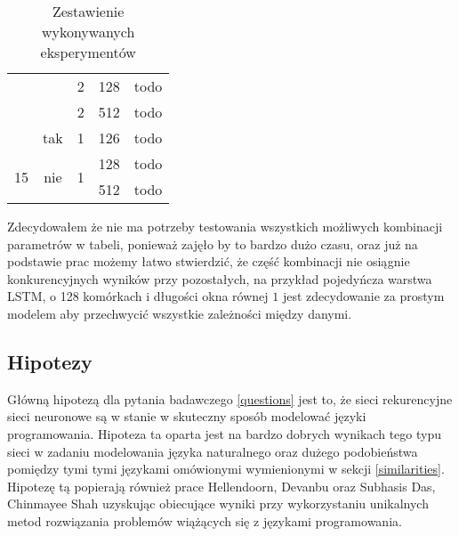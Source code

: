 \begin{table}[ht]
{\begin{tabular}{ccccc}
            \multicolumn{1}{|c|}{}                    & \multicolumn{1}{c|}{}                     & \multicolumn{1}{c|}{2}                  & \multicolumn{1}{c|}{128}                        & \multicolumn{1}{c|}{todo}                         \\ \cline{3-5} 
            \multicolumn{1}{|c|}{}                    & \multicolumn{1}{c|}{}                     & \multicolumn{1}{c|}{2}                  & \multicolumn{1}{c|}{512}                        & \multicolumn{1}{c|}{todo}                         \\ \cline{2-5} 
            \multicolumn{1}{|c|}{}                    & \multicolumn{1}{c|}{tak}                  & \multicolumn{1}{c|}{1}                  & \multicolumn{1}{c|}{126}                        & \multicolumn{1}{c|}{todo}                         \\ \hline
            \multicolumn{1}{|c|}{\multirow{2}{*}{15}} & \multicolumn{1}{c|}{\multirow{2}{*}{nie}} & \multicolumn{1}{c|}{\multirow{2}{*}{1}} & \multicolumn{1}{c|}{128}                        & \multicolumn{1}{c|}{todo}                         \\ \cline{4-5} 
            \multicolumn{1}{|c|}{}                    & \multicolumn{1}{c|}{}                     & \multicolumn{1}{c|}{}                   & \multicolumn{1}{c|}{512}                        & \multicolumn{1}{c|}{todo}                         \\ \hline
            \end{tabular}}
    \caption{Zestawienie wykonywanych eksperymentów} 
    \label{eksperymenty}
\end{table} 
Zdecydowałem że nie ma potrzeby testowania wszystkich możliwych kombinacji parametrów w tabeli, ponieważ zajęło by to bardzo dużo czasu, oraz już na podstawie prac 
\cite{hellendoorn, pythia} możemy łatwo stwierdzić, że część kombinacji nie osiągnie konkurencyjnych wyników przy pozostałych, na przykład pojedyńcza warstwa LSTM, o 
128 komórkach i długości okna równej \begin{math}1\end{math} jest zdecydowanie za prostym modelem aby przechwycić wszystkie zależności między danymi. 


\subsection{Hipotezy}
Główną hipotezą dla pytania badawczego \ref{questions} jest to, że sieci rekurencyjne sieci neuronowe są w stanie w skuteczny sposób modelować języki programowania. Hipoteza 
ta oparta jest na bardzo dobrych wynikach tego typu sieci w zadaniu modelowania języka naturalnego oraz dużego podobieństwa pomiędzy tymi tymi językami omówionymi wymienionymi 
w sekcji \ref{similarities}. Hipotezę tą popierają również prace Hellendoorn, Devanbu\cite{hellendoorn} oraz Subhasis Das, Chinmayee Shah\cite{contextual_code_completion} uzyskując
obiecujące wyniki przy wykorzystaniu unikalnych metod rozwiązania problemów wiążących się z językami programowania. 
